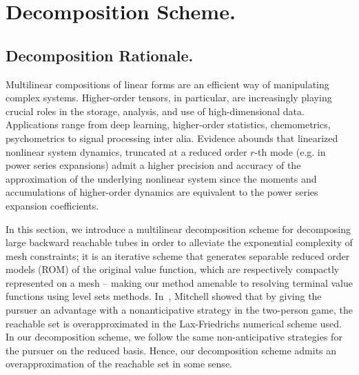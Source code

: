 \section{Decomposition Scheme.}
\label{sec:methods}
\subsection{Decomposition Rationale.}
Multilinear compositions of linear forms are an efficient way of manipulating complex systems.   Higher-order tensors, in particular, are increasingly playing crucial roles in the storage, analysis, and use of high-dimensional data. Applications range from deep learning, higher-order statistics, chemometrics, psychometrics to signal processing inter alia. Evidence abounds that linearized nonlinear system dynamics, truncated at a reduced order $r$-th mode (e.g. in power series expansions\cite{iDG, JacobsonMayne, Mitter1966, McReynolds1967}) admit a higher precision and accuracy of the approximation of the underlying nonlinear system since the moments and accumulations of higher-order dynamics are equivalent to the power series expansion coefficients.  

In this section, we introduce a multilinear decomposition scheme for decomposing large backward reachable tubes in order to alleviate the exponential complexity of mesh constraints; it is an iterative scheme that generates separable reduced order models (ROM) of the original value function, which are respectively compactly represented on a mesh -- making our method amenable to resolving terminal value functions using level sets methods. 
In~\cite{Mitchell2005}, Mitchell showed that by giving the pursuer an advantage with a  nonanticipative strategy in the two-person game, the reachable set is overapproximated in the Lax-Friedrichs numerical scheme used. In our decomposition scheme, we follow the same non-anticipative strategies for the pursuer on the reduced basis. Hence, our decomposition scheme admits an overapproximation of the reachable set in some sense.



